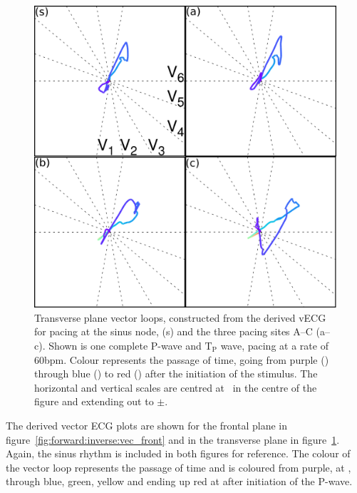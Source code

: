 \begin{figure}
\begin{center}
\includegraphics{figures/forward/inverted_p_wave/transverse_vector_loops}
\end{center}
\caption[Transverse plane vector loops from pacing sites along the CT]{
\label{fig:forward:inverse:vec_trans}
Transverse plane vector loops, constructed from the derived vECG for pacing at the
sinus node, (s) and the three pacing sites A--C (a--c).
Shown is one complete P-wave and $\text{T}_{\text{P}}$ wave, pacing at a rate of
\unit{60}{bpm}.
Colour represents the passage of time, going from purple () through blue
() to red () after the initiation of the stimulus.
The horizontal and vertical scales are centred at \ in the centre of the
figure and extending out to $\pm$.}
\end{figure}

The derived vector ECG plots are shown for the frontal plane in
figure~\ref{fig:forward:inverse:vec_front} and in the transverse plane in
figure~\ref{fig:forward:inverse:vec_trans}.
Again, the sinus rhythm is included in both figures for reference.
The colour of the vector loop represents the passage of time and is coloured
from purple, at , through blue, green, yellow and ending up red at
 after initiation of the P-wave.

